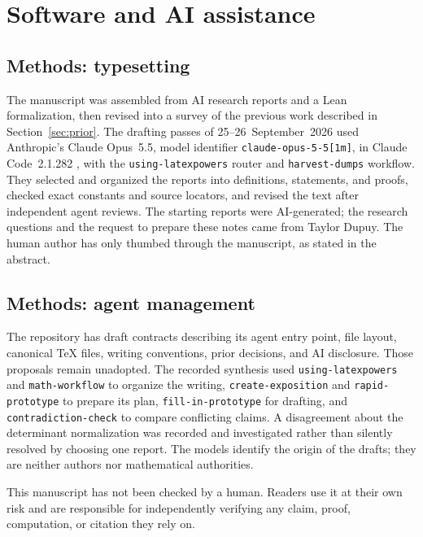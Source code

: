 \documentclass[11pt]{amsart}
\theoremstyle{plain}
\theoremstyle{definition}
\theoremstyle{remark}
\numberwithin{equation}{section}
\begin{document}
\section{Software and AI assistance}
\label{sec:ai}

\subsection{Methods: typesetting}
The manuscript was assembled from AI research reports and a Lean
formalization, then revised into a survey of the previous work described
in Section~\ref{sec:prior}. The drafting passes of 25--26~September~2026
used Anthropic's Claude Opus~5.5, model identifier
\nolinkurl{claude-opus-5-5[1m]}, in Claude Code~2.1.282
\cite[\href{https://claude.com/product/claude-code}{product description}]%
{AnthropicClaudeCode,AnthropicClaudeOpus}, with the \nolinkurl{using-latexpowers} router and
\nolinkurl{harvest-dumps} workflow. They selected and organized the reports
into definitions, statements, and proofs, checked exact constants and
source locators, and revised the text after independent agent reviews.
The starting reports were AI-generated; the research questions and the
request to prepare these notes came from Taylor Dupuy. The human author
has only thumbed through the manuscript, as stated in the abstract.

\subsection{Methods: agent management}
The repository has draft contracts describing its agent entry point,
file layout, canonical \TeX{} files, writing conventions, prior decisions,
and AI disclosure. Those proposals remain unadopted. The recorded
synthesis used \nolinkurl{using-latexpowers} and \nolinkurl{math-workflow} to
organize the writing, \nolinkurl{create-exposition} and
\nolinkurl{rapid-prototype} to prepare its plan, \nolinkurl{fill-in-prototype}
for drafting, and \nolinkurl{contradiction-check} to compare conflicting
claims. A disagreement about the determinant normalization was recorded
and investigated rather than silently resolved by choosing one report.
The models identify the origin of the drafts; they are neither authors
nor mathematical authorities.

This manuscript has not been checked by a human. Readers use it at their
own risk and are responsible for independently verifying any claim,
proof, computation, or citation they rely on.
\end{document}
